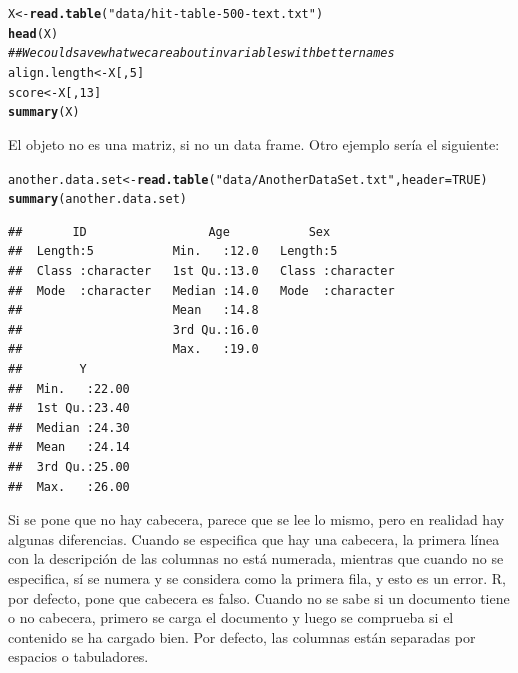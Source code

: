 \documentclass{config/apuntes}\usepackage[]{graphicx}\usepackage[]{xcolor}
\makeatletter
\newcommand{\hlnum}[1]{\textcolor[rgb]{0.686,0.059,0.569}{#1}}%
\newcommand{\hlsng}[1]{\textcolor[rgb]{0.192,0.494,0.8}{#1}}%
\newcommand{\hlcom}[1]{\textcolor[rgb]{0.678,0.584,0.686}{\textit{#1}}}%
\newcommand{\hldef}[1]{\textcolor[rgb]{0.345,0.345,0.345}{#1}}%
\newcommand{\hlkwb}[1]{\textcolor[rgb]{0.69,0.353,0.396}{#1}}%
\newcommand{\hlkwc}[1]{\textcolor[rgb]{0.333,0.667,0.333}{#1}}%
\newcommand{\hlkwd}[1]{\textcolor[rgb]{0.737,0.353,0.396}{\textbf{#1}}}%
\newenvironment{kframe}{%
 \def\at@end@of@kframe{}%
 \ifinner\ifhmode%
  \def\at@end@of@kframe{\end{minipage}}%
  \begin{minipage}{\columnwidth}%
 \fi\fi%
 \def\FrameCommand##1{\hskip\@totalleftmargin \hskip-\fboxsep
 \colorbox{shadecolor}{##1}\hskip-\fboxsep
     \hskip-\linewidth \hskip-\@totalleftmargin \hskip\columnwidth}%
 \MakeFramed {\advance\hsize-\width
   \@totalleftmargin\z@ \linewidth\hsize
   \@setminipage}}%
 {\par\unskip\endMakeFramed%
 \at@end@of@kframe}
\newenvironment{knitrout}{}{} %
\makeatother
\begin{document}
\begin{knitrout}
\color{fgcolor}\begin{kframe}
\begin{alltt}
\hldef{X} \hlkwb{<-} \hlkwd{read.table}\hldef{(}\hlsng{"data/hit-table-500-text.txt"}\hldef{)}
\hlkwd{head}\hldef{(X)}
\hlcom{## We could save what we care about in variables with better names}
\hldef{align.length} \hlkwb{<-} \hldef{X[,} \hlnum{5}\hldef{]}
\hldef{score} \hlkwb{<-} \hldef{X[,} \hlnum{13}\hldef{]}
\hlkwd{summary}\hldef{(X)}
\end{alltt}
\end{kframe}
\end{knitrout}

El objeto no es una matriz, si no un data frame. Otro ejemplo sería el siguiente:
\begin{knitrout}
\color{fgcolor}\begin{kframe}
\begin{alltt}
\hldef{another.data.set} \hlkwb{<-} \hlkwd{read.table}\hldef{(}\hlsng{"data/AnotherDataSet.txt"}\hldef{,} \hlkwc{header} \hldef{=} \hlnum{TRUE}\hldef{)}
\hlkwd{summary}\hldef{(another.data.set)}
\end{alltt}
\begin{verbatim}
##       ID                 Age           Sex           
##  Length:5           Min.   :12.0   Length:5          
##  Class :character   1st Qu.:13.0   Class :character  
##  Mode  :character   Median :14.0   Mode  :character  
##                     Mean   :14.8                     
##                     3rd Qu.:16.0                     
##                     Max.   :19.0                     
##        Y        
##  Min.   :22.00  
##  1st Qu.:23.40  
##  Median :24.30  
##  Mean   :24.14  
##  3rd Qu.:25.00  
##  Max.   :26.00
\end{verbatim}
\end{kframe}
\end{knitrout}
Si se pone que no hay cabecera, parece que se lee lo mismo, pero en realidad hay algunas diferencias. Cuando se especifica que hay una cabecera, la primera línea con la descripción de las columnas no está numerada, mientras que cuando no se especifica, sí se numera y se considera como la primera fila, y esto es un error. R, por defecto, pone que cabecera es falso. Cuando no se sabe si un documento tiene o no cabecera, primero se carga el documento y luego se comprueba si el contenido se ha cargado bien. Por defecto, las columnas están separadas por espacios o tabuladores.
\end{document}
